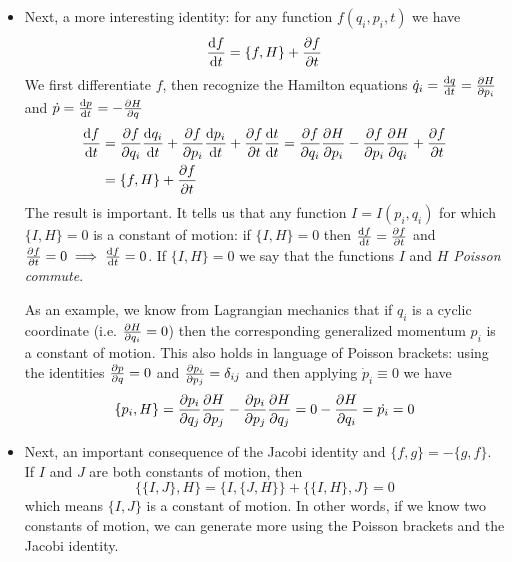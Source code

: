 \documentclass[11pt, a4paper]{article}
\begin{document}
\begin{itemize}
	\item Next, a more interesting identity: for any function $ f(q_{i}, p_{i}, t) $ we have
	\begin{equation*}
		\dv{f}{t} = \{f, H\} + \pdv{f}{t} 
	\end{equation*}
	We first differentiate $ f $, then recognize the Hamilton equations $ \dot{q}_{i} = \dv{q}{t} = \pdv{H}{p_{i}} $ and $ \dot{p} = \dv{p}{t} = -\pdv{H}{q} $
	\begin{align*}
		\dv{f}{t} &= \pdv{f}{q_{i}}\dv{q_{i}}{t} + \pdv{f}{p_{i}} \dv{p_{i}}{t} + \pdv{f}{t} \dv{t}{t} = \pdv{f}{q_{i}} \pdv{H}{p_{i}} - \pdv{f}{p_{i}} \pdv{H}{q_{i}} + \pdv{f}{t}\\
		&=\{f, H\} + \pdv{f}{t}
	\end{align*}
	The result is important. It tells us that any function $ I = I(p_{i}, q_{i}) $ for which $ \{I, H\} = 0 $ is a constant of motion: if $ \{I, H\} = 0 $ then $ \dv{f}{t} = \pdv{f}{t} $ and $ \pdv{f}{t} = 0 \implies \dv{f}{t} = 0 $. If $ \{I, H\} = 0 $ we say that the functions $ I $ and $ H $ \textit{Poisson commute}. 
	
	As an example, we know from Lagrangian mechanics that if $ q_{i} $ is a cyclic coordinate (i.e. $ \pdv{H}{q_{i}} = 0 $) then the corresponding generalized momentum $ p_{i} $ is a constant of motion. This also holds in language of Poisson brackets: using the identities $ \pdv{p}{q} = 0 $ and $ \pdv{p_{i}}{p_{j}} = \delta_{i j} $ and then applying $ \dot{p}_{i} \equiv 0 $ we have
	\begin{equation*}
		\{p_{i}, H\} = \pdv{p_{i}}{q_{j}} \pdv{H}{p_{j}} - \pdv{p_{i}}{p_{j}}\pdv{H}{q_{j}} = 0 - \pdv{H}{q_{i}} = \dot{p_{i}} = 0
	\end{equation*}
	
	\item Next, an important consequence of the Jacobi identity and $ \{f, g\} = - \{g, f\} $. If $ I $ and $ J $ are both constants of motion, then
	\begin{equation*}
		\{\{I, J\}, H\} = \{I, \{J, H \}\} + \{\{I, H\}, J\} = 0
	\end{equation*}
	which means $ \{I, J\} $ is a constant of motion. In other words, if we know two constants of motion, we can generate more using the Poisson brackets and the Jacobi identity.
\end{itemize}
\end{document}
